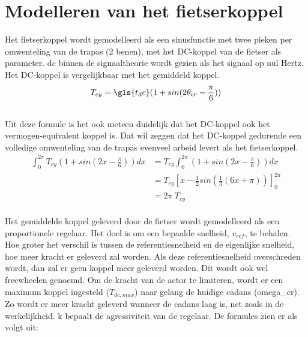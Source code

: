\section{Modelleren van het fietserkoppel}
Het fietserkoppel wordt gemodelleerd als een sinusfunctie met twee pieken per omwenteling van de trapas (2 benen), met het DC-koppel van de fietser als parameter. \gls{dc} binnen de signaaltheorie wordt gezien als het signaal op nul Hertz. Het DC-koppel is vergelijkbaar met het gemiddeld koppel.
\\
\begin{gather*}
 T_{cy} = \gls{t_dc}(1+sin(2\theta_{cr}-\frac{\pi}{6}))
\end{gather*}
\\
Uit deze formule is het ook meteen duidelijk dat het DC-koppel ook het vermogen-equivalent koppel is. Dat wil zeggen dat het DC-koppel gedurende een volledige omwenteling van de trapas evenveel arbeid levert als het fietserkoppel.
\\
\begin{align*}
\int_{0}^{2\pi} T_{cy}(1+sin(2x-\frac{\pi}{6})) dx &= T_{cy} \int_{0}^{2\pi}(1+sin(2x-\frac{\pi}{6})) dx\\
&= T_{cy} \left[x-\frac{1}{2}sin(\frac{1}{3}(6x+\pi))\right]_0^{2\pi}\\
&= 2\pi \ T_{cy}
\end{align*}
\\
\noindent
Het gemiddelde koppel geleverd door de fietser wordt gemodelleerd als een proportionele regelaar. Het doel is om een bepaalde snelheid, $v_{ref}$, te behalen. Hoe groter het verschil is tussen de referentiesnelheid en de eigenlijke snelheid, hoe meer kracht er geleverd zal worden. Als deze referentiesnelheid overschreden wordt, dan zal er geen koppel meer geleverd worden. Dit wordt ook wel freewheelen genoemd. Om de kracht van de actor te limiteren, wordt er een maximum koppel ingesteld ($T_{dc,max}$) naar gelang de huidige cadans (\gls{omega_cr}). Zo wordt er meer kracht geleverd wanneer de cadans laag is, net zoals in de werkelijkheid. \gls{k} bepaalt de agressiviteit van de regelaar. De formules zien er als volgt uit:

